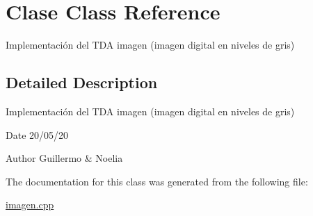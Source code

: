 \hypertarget{classClase}{}\section{Clase Class Reference}
\label{classClase}


Implementación del T\+DA imagen (imagen digital en niveles de gris)  




\subsection{Detailed Description}
Implementación del T\+DA imagen (imagen digital en niveles de gris) 

\begin{DoxyDate}{Date}
20/05/20 
\end{DoxyDate}
\begin{DoxyAuthor}{Author}
Guillermo \& Noelia 
\end{DoxyAuthor}


The documentation for this class was generated from the following file\+:\begin{DoxyCompactItemize}
\item 
\hyperlink{imagen_8cpp}{imagen.\+cpp}\end{DoxyCompactItemize}
